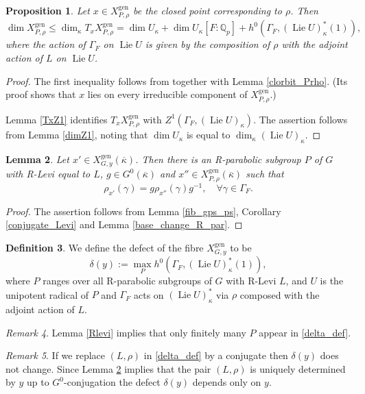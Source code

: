 \documentclass{amsart}
\newtheorem{prop}{Proposition}[section]
\newtheorem{lem}[prop]{Lemma}
\theoremstyle{definition}
\newtheorem{defi}[prop]{Definition}
\theoremstyle{remark}
\newtheorem{remar}[prop]{Remark}
\newcommand{\Qp}{\mathbb {Q}_p}
\newcommand{\gen}{\mathrm{gen}}
\newcommand{\kappabar}{\overline{\kappa}}
\DeclareMathOperator{\Lie}{Lie}
\begin{document}
 \begin{prop}\label{bound_P} Let $x\in X_{P, \rho}^{\gen}$ be the closed point corresponding to $\rho$. Then 
 $$\dim X^{\gen}_{P,\rho} \le \dim_{\kappa} T_{x} X^{\gen}_{P, \rho}= \dim U_{\kappa} + \dim U_{\kappa} [F:\Qp] + h^0(\Gamma_F, (\Lie U)_{\kappa}^*(1)),$$
 where the action of $\Gamma_F$ on $\Lie U$ is given by the composition of $\rho$ with the adjoint action of $L$ on $\Lie U$. 
 \end{prop}

 \begin{proof} The first inequality follows from \cite[Lemma 2.2]{BIP_new} together 
with Lemma \ref{clorbit_Prho}. (Its proof shows that $x$ lies on every 
irreducible component of $X_{P, \rho}^{\gen}$.) 

Lemma \ref{TxZ1} identifies $T_xX^{\gen}_{P,\rho}$ with $Z^1(\Gamma_F, (\Lie U)_{\kappa})$.
The assertion follows from Lemma \ref{dimZ1}, noting that $\dim U_{\kappa}$  is equal to $\dim_{\kappa} (\Lie U)_{\kappa}$. 
\end{proof} 




\begin{lem}\label{conj_P2} Let $x'\in X^{\gen}_{G, y}(\kappabar)$. 
Then there is an R-parabolic subgroup $P$ of $G$
with R-Levi equal to $L$, $g\in G^0(\kappabar)$ and $x''\in X^{\gen}_{P, \rho}(\kappabar)$ such that 
$$ \rho_{x'}(\gamma)= g \rho_{x''}(\gamma) g^{-1}, \quad \forall \gamma\in \Gamma_F.$$ 
\end{lem} 
\begin{proof} The assertion follows from Lemma \ref{fib_gps_ps}, Corollary \ref{conjugate_Levi} and Lemma \ref{base_change_R_par}.
\end{proof}

\begin{defi}\label{defi_defect} We define the defect of the fibre $X^{\gen}_{G,y}$ to be 
\begin{equation}\label{delta_def}
 \delta(y):= \max_{P} h^0(\Gamma_F, (\Lie U)_{\kappa}^*(1)),
\end{equation}
where $P$ ranges over all R-parabolic subgroups of $G$ with R-Levi $L$, and $U$ is the unipotent radical of $P$ and $\Gamma_F$ acts on $(\Lie U)_{\kappa}^*$ via 
$\rho$ composed with the adjoint action of $L$.
\end{defi}
\begin{remar} Lemma \ref{Rlevi} implies that only finitely many $P$ appear in \eqref{delta_def}.
\end{remar}
\begin{remar} If we replace $(L, \rho)$ in \eqref{delta_def} by a conjugate then $\delta(y)$ 
does not change. Since Lemma \ref{conj_P2} implies that the pair $(L, \rho)$ is uniquely determined by $y$ up to $G^0$-conjugation the defect $\delta(y)$ depends only on $y$.   
\end{remar}
\end{document}
